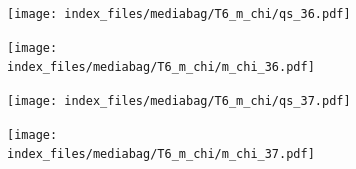 \documentclass[
  11pt,
  letterpaper,
]{scrreprt}
\begin{document}
\begin{figure}

\begin{minipage}{0.50\linewidth}

\begin{figure}[H]

{\centering \texttt{[image: index\_files/mediabag/T6\_m\_chi/qs\_36.pdf]}

}


\end{figure}%

\end{minipage}%
%
\begin{minipage}{0.50\linewidth}

\begin{figure}[H]

{\centering \texttt{[image: index\_files/mediabag/T6\_m\_chi/m\_chi\_36.pdf]}

}


\end{figure}%

\end{minipage}%

\end{figure}%

\begin{figure}

\begin{minipage}{0.50\linewidth}

\begin{figure}[H]

{\centering \texttt{[image: index\_files/mediabag/T6\_m\_chi/qs\_37.pdf]}

}


\end{figure}%

\end{minipage}%
%
\begin{minipage}{0.50\linewidth}

\begin{figure}[H]

{\centering \texttt{[image: index\_files/mediabag/T6\_m\_chi/m\_chi\_37.pdf]}

}


\end{figure}%

\end{minipage}%

\end{figure}%
\end{document}
